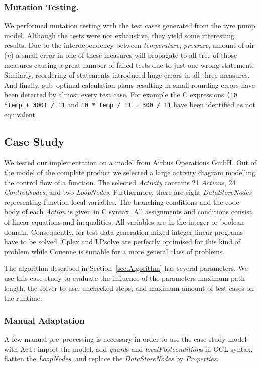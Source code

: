 \documentclass[runningheads,a4paper]{llncs}%
\newcommand{\UMLType}[1]{\textsf{\textit{#1}}} %
\newcommand{\UMLReference}[1]{\textsf{\textit{#1}}} %
\newcommand{\OCLVar}[1]{\textit{#1}}
\begin{document}
\subsubsection{Mutation Testing.}
We performed mutation testing with the test cases generated from the tyre pump
model. Although the tests were not exhaustive, they yield some interesting
results. Due to the interdependency between \OCLVar{temperature},
\OCLVar{pressure}, amount of air (\OCLVar{n}) a small error in one of these
measures will propagate to all tree of those measures causing a great number of
failed tests due to just one wrong statement. Similarly, reordering of
statements introduced huge errors in all three measures. And finally,
sub--optimal calculation plans resulting in small rounding errors have been
detected by almost every test case. For example the C expressions 
\verb$(10 *temp + 300) / 11$ and \verb$10 * temp / 11 + 300 / 11$ have been 
identified as not equivalent.
\subsection{Case Study}
\label{sec:CaseStudy}
We tested our implementation on a model from Airbus Operations GmbH. Out of the
model of the complete product we selected a large activity diagram modelling the
control flow of a function. The selected \UMLType{Activity} contains 21
\UMLType{Actions}, 24 \UMLType{ControlNodes}, and two \UMLType{LoopNodes}.
Furthermore, there are eight \UMLType{DataStoreNodes} representing function
local variables. The branching conditions and the code body of each
\UMLType{Action} is given in C syntax. All assignments and conditions consist of
linear equations and inequalities. All variables are in the integer or boolean
domain. Consequently, for test data generation mixed integer linear programs
have to be solved. Cplex and LPsolve are perfectly optimised for this kind of
problem while Couenne is suitable for a more general class of problems.

The algorithm described in Section~\ref{sec:Algorithm} has several parameters.
We use this case study to evaluate the influence of the parameters maximum path length, the solver to use, unchecked steps, and maximum amount of test cases on the runtime.
\subsubsection{Manual Adaptation}
A few manual pre--processing is necessary in order to use the case study model
with AcT: import the model, add \UMLReference{guard}s and
\UMLReference{localPostcondition}s in OCL syntax, flatten the
\UMLType{LoopNodes}, and replace the \UMLType{DataStoreNodes} by
\UMLType{Properties}.
\end{document}
